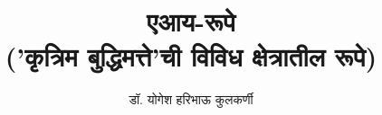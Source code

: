 
\usepackage{fontspec}
\usepackage{tikz}
\usepackage{everypage}

\setmainfont[Script=Devanagari] {Tiro Devanagari Marathi}
\newfontfamily{}
\newfontfamily{}
\graphicspath{{images/}}


\date{} %


\title{
    {\Huge \textbf{एआय-रूपे}} \\ 
    \vspace{0.5em}
    {\large ('कृत्रिम बुद्धिमत्ते'ची विविध क्षेत्रातील रूपे)}
}
\author{\textsc{डॉ. योगेश हरिभाऊ कुलकर्णी}}


\frontmatter
\maketitle


\tableofcontents

\mainmatter




